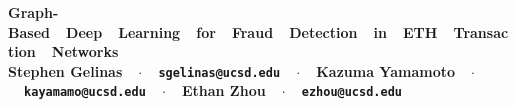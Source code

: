 \documentclass[article,36pt,extrafontsizes,oneside,openany,oldfontcommands]{memoir}
\begin{document}
\begin{topbox}
  \color{titletextcol}
  \vspace{0.8in}
  \bfseries
  \fontsize{100pt}{100pt}\selectfont
  {Graph-Based~~Deep~~Learning~~for~~Fraud~~Detection~~in~~ETH~~Transaction~~Networks}\\[0.5in]  %
  \color{authortextcol} 
  \mdseries
  \fontsize{40pt}{40pt}\selectfont
  {Stephen Gelinas~~$\cdot$~~\texttt{sgelinas@ucsd.edu}~~$\cdot$~~Kazuma Yamamoto~~$\cdot$~~\texttt{kayamamo@ucsd.edu}~~$\cdot$~~Ethan Zhou~~$\cdot$~~\texttt{ezhou@ucsd.edu}} 
  \vspace{0.6in}
\end{topbox}




\fontsize{45pt}{45pt}\selectfont
\end{document}
